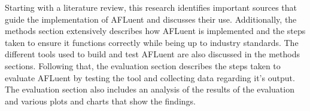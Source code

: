 Starting with a literature review, this research identifies important sources
that guide the implementation of AFLuent and discusses their use. Additionally,
the methods section extensively describes how AFLuent is implemented and the
steps taken to ensure it functions correctly while being up to industry
standards. The different tools used to build and test AFLuent are also
discussed in the methods sections. Following that, the evaluation section
describes the steps taken to evaluate AFLuent by testing the tool and
collecting data regarding it's output. The evaluation section also includes an
analysis of the results of the evaluation and various plots and charts that
show the findings.
